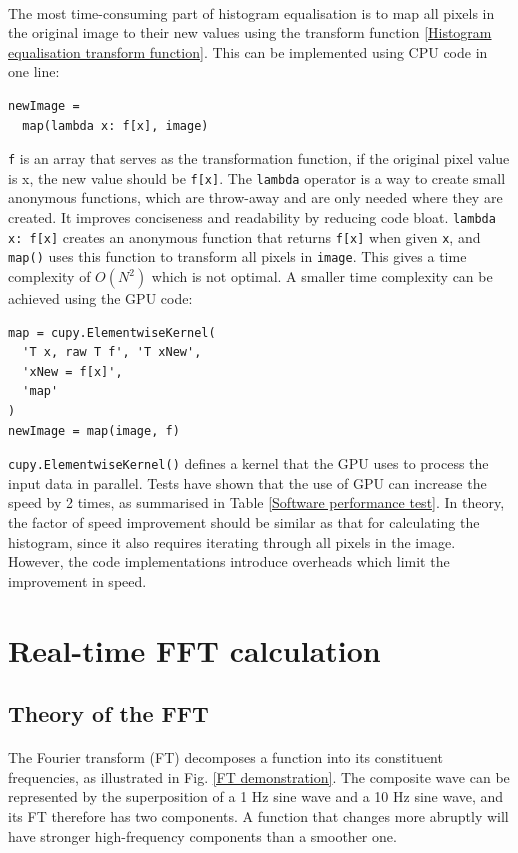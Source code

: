 \documentclass[12pt, twocolumn]{report}
\begin{document}
\paragraph{}
The most time-consuming part of histogram equalisation is to map all pixels in the original image to their new values using the transform function \eqref{Histogram equalisation transform function}. This can be implemented using CPU code in one line:
\begin{lstlisting}
newImage = 
  map(lambda x: f[x], image)
\end{lstlisting}
\lstinline{f} is an array that serves as the transformation function, if the original pixel value is x, the new value should be \lstinline{f[x]}. The \lstinline{lambda} operator is a way to create small anonymous functions, which are throw-away and are only needed where they are created. It improves conciseness and readability by reducing code bloat. \lstinline{lambda x: f[x]} creates an anonymous function that returns \lstinline{f[x]} when given \lstinline{x}, and \lstinline{map()} uses this function to transform all pixels in \lstinline{image}. This gives a time complexity of $O(N^2)$ which is not optimal. A smaller time complexity can be achieved using the GPU code:
\begin{lstlisting}
map = cupy.ElementwiseKernel(
  'T x, raw T f', 'T xNew',
  'xNew = f[x]',
  'map'
)
newImage = map(image, f)
\end{lstlisting}
\lstinline{cupy.ElementwiseKernel()} defines a kernel that the GPU uses to process the input data in parallel. Tests have shown that the use of GPU can increase the speed by 2 times, as summarised in Table \ref{Software performance test}. In theory, the factor of speed improvement should be similar as that for calculating the histogram, since it also requires iterating through all pixels in the image. However, the code implementations introduce overheads which limit the improvement in speed.

\section{Real-time FFT calculation}
\subsection{Theory of the FFT}
\paragraph{}
The Fourier transform (FT) decomposes a function into its constituent frequencies, as illustrated in Fig. \ref{FT demonstration}. The composite wave can be represented by the superposition of a 1 Hz sine wave and a 10 Hz sine wave, and its FT therefore has two components. A function that changes more abruptly will have stronger high-frequency components than a smoother one.
\end{document}
